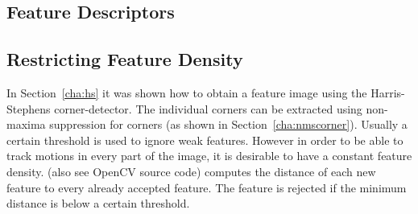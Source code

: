 \documentclass[12pt,a4paper,oneside,openright]{book}
\newcommand{\sct}[1]{Section~\ref{cha:#1}}
\begin{document}
\begin{CJK}{UTF8}{}
\section{Feature Descriptors}\label{cha:featdesc}
\subsection{Restricting Feature Density}
In \sct{hs} it was shown how to obtain a feature image using the Harris-Stephens corner-detector. The individual corners can be extracted using non-maxima suppression for corners (as shown in \sct{nmscorner}). Usually a certain threshold is used to ignore weak features. However in order to be able to track motions in every part of the image, it is desirable to have a constant feature density. \citet{RefWorks:517} (also see OpenCV source code) computes the distance of each new feature to every already accepted feature. The feature is rejected if the minimum distance is below a certain threshold.


\end{CJK}
\end{document}
